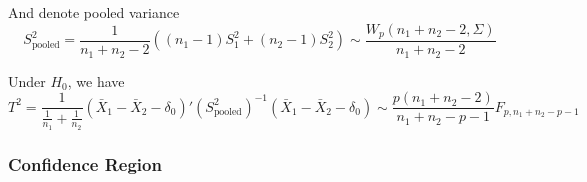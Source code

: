 \begin{itemize}[topsep=2pt,itemsep=2pt]
\begin{itemize}[topsep=2pt,itemsep=2pt]
        And denote pooled variance
        \[
            S^2_\mathrm{pooled}=\dfrac{1}{n_1+n_2-2}\left((n_1-1)S^2_1+(n_2-1)S^2_2 \right)  \sim \dfrac{W_p(n_1+n_2-2,\Sigma )}{n_1+n_2-2}
        \]
        
        Under $ H_0 $, we have 
        \[
            T^2= \dfrac{1}{\frac{1}{n_1}+\frac{1}{n_2}}(\bar{X}_1-\bar{X}_2-\delta _0)'(S^2_\mathrm{pooled})^{-1}(\bar{X}_1-\bar{X}_2-\delta _0)\sim \dfrac{p(n_1+n_2-2)}{n_1+n_2-p-1}F_{p,n_1+n_2-p-1}
        \]
        

    \end{itemize}
    
    


\end{itemize}




    


\subsubsection{Confidence Region}


